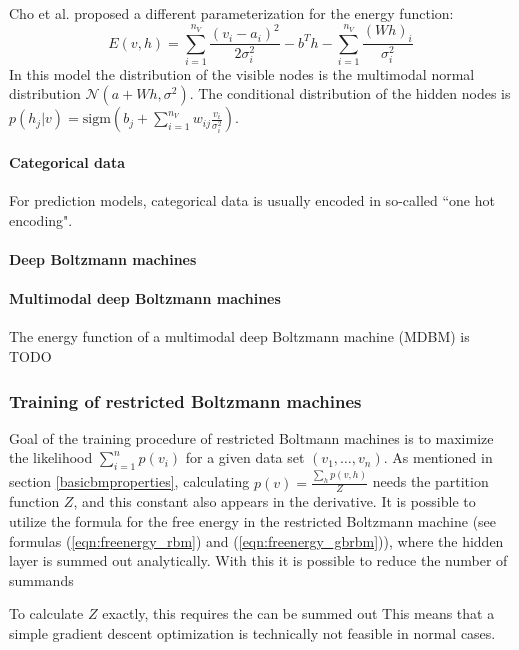 \documentclass[12pt]{article}
\newcommand{\sigm}{\mathrm{sigm}}
\begin{document}
Cho et al. \citep{cho2011improved} proposed a different parameterization for the energy function:
\[
   E(v,h) = \sum_{i=1}^{n_V}\frac{(v_i - a_i)^2}{2\sigma_i^2} - b^T h - \sum_{i=1}^{n_V} \frac{(Wh)_i}{\sigma_i^2}
\]
In this model the distribution of the visible nodes is the multimodal normal distribution $\mathcal{N}(a + Wh, \sigma^2)$.
The conditional distribution of the hidden nodes is $p(h_j | v) = \sigm \left (b_j + \sum_{i=1}^{n_V} w_{ij} \frac{v_i}{\sigma_i^2} \right )$.


\paragraph{Categorical data}
For prediction models, categorical data is usually encoded in so-called ``one hot encoding".

\paragraph{Deep Boltzmann machines}

\paragraph{Multimodal deep Boltzmann machines}

The energy function of a multimodal deep Boltzmann machine (MDBM) is TODO


\subsubsection{Training of restricted Boltzmann machines}\label{rbmtraining}
Goal of the training procedure of restricted Boltmann machines is to maximize the likelihood $\sum_{i=1}^n p(v_i)$ for a given data set $(v_1, \dots, v_n)$.
As mentioned in section \ref{basicbmproperties}, calculating $p(v) = \frac{\sum_{h} p(v,h)}{Z}$ needs the partition function $Z$, and this constant also appears in the derivative.
It is possible to utilize the formula for the free energy in the restricted Boltzmann machine (see formulas (\ref{eqn:freenergy_rbm}) and (\ref{eqn:freenergy_gbrbm})), where the hidden layer is summed out analytically.
With this it is possible to reduce the number of summands

To calculate $Z$ exactly, this requires the can be summed out 
This means that a simple gradient descent optimization is technically not feasible in normal cases. 
\end{document}
